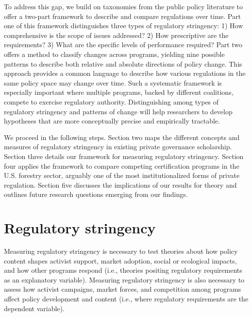 \documentclass[
      12pt,
            Review ]{article}
\begin{document}
To address this gap, we build on taxonomies from the public policy literature to offer a two-part framework to describe and compare regulations over time. Part one of this framework distinguishes three types of regulatory stringency: 1) How comprehensive is the scope of issues addressed? 2) How prescriptive are the requirements? 3) What are the specific levels of performance required? Part two offers a method to classify changes across programs, yielding nine possible patterns to describe both relative and absolute directions of policy change. This approach provides a common language to describe how various regulations in the same policy space may change over time. Such a systematic framework is especially important where multiple programs, backed by different coalitions, compete to exercise regulatory authority. Distinguishing among types of regulatory stringency and patterns of change will help researchers to develop hypotheses that are more conceptually precise and empirically tractable.

We proceed in the following steps. Section two maps the different concepts and measures of regulatory stringency in existing private governance scholarship. Section three details our framework for measuring regulatory stringency. Section four applies the framework to compare competing certification programs in the U.S. forestry sector, arguably one of the most institutionalized forms of private regulation. Section five discusses the implications of our results for theory and outlines future research questions emerging from our findings.

\hypertarget{regulatory-stringency}{%
\section{Regulatory stringency}\label{regulatory-stringency}}

Measuring regulatory stringency is necessary to test theories about how policy content shapes activist support, market adoption, social or ecological impacts, and how other programs respond (i.e., theories positing regulatory requirements as an explanatory variable). Measuring regulatory stringency is also necessary to assess how activist campaigns, market forces, and competition among programs affect policy development and content (i.e., where regulatory requirements are the dependent variable).
\end{document}
